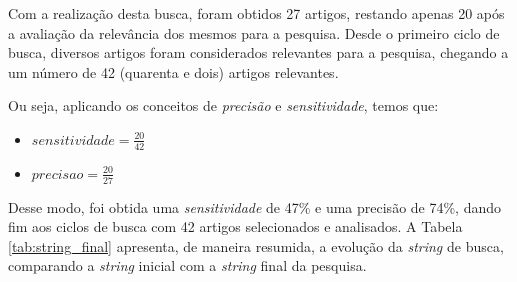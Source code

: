 		Com a realização desta busca, foram obtidos 27 artigos, restando apenas 20 após a avaliação da relevância dos mesmos para a pesquisa. Desde o primeiro ciclo de busca, diversos artigos foram considerados relevantes para a pesquisa, chegando a um número de 42 (quarenta e dois) artigos relevantes.

		Ou seja, aplicando os conceitos de \textit{precisão} e \textit{sensitividade}, temos que:

		\begin{itemize}
			\item $sensitividade = \frac{20}{42}$
			\item $precisao = \frac{20}{27}$
		\end{itemize}

		Desse modo, foi obtida uma \textit{sensitividade} de 47\% e uma precisão de 74\%, dando fim aos ciclos de busca com 42 artigos selecionados e analisados. A Tabela \ref{tab:string_final} apresenta, de maneira resumida, a evolução da \textit{string} de busca, comparando a \textit{string} inicial com a \textit{string} final da pesquisa.

